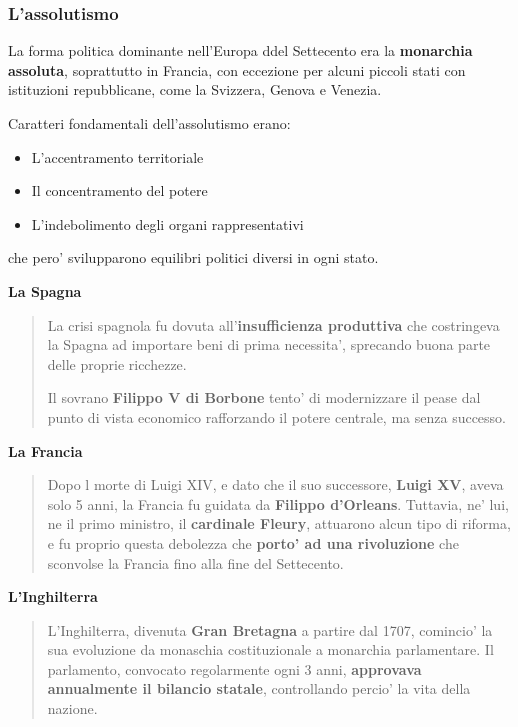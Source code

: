 \documentclass{article}
\begin{document}
{{    \subsubsection{L'assolutismo} %
    La forma politica dominante nell'Europa ddel Settecento era la \textbf{monarchia assoluta}, soprattutto in Francia, con eccezione per alcuni piccoli stati con istituzioni repubblicane, come la Svizzera, Genova e Venezia.

    Caratteri fondamentali dell'assolutismo erano:

    \begin{itemize}
      \item L'accentramento territoriale
      \item Il concentramento del potere
      \item L'indebolimento degli organi rappresentativi
    \end{itemize}

    che pero' svilupparono equilibri politici diversi in ogni stato.

    \textbf{La Spagna}
    \begin{quote}
      La crisi spagnola fu dovuta all'\textbf{insufficienza produttiva} che costringeva la Spagna ad importare beni di prima necessita', sprecando buona parte delle proprie ricchezze.

      Il sovrano \textbf{Filippo V di Borbone} tento' di modernizzare il pease dal punto di vista economico rafforzando il potere centrale, ma senza successo.
    \end{quote}

    \textbf{La Francia}
    \begin{quote}
      Dopo l morte di Luigi XIV, e dato che il suo successore, \textbf{Luigi XV}, aveva solo 5 anni, la Francia fu guidata da \textbf{Filippo d'Orleans}. Tuttavia, ne' lui, ne il primo ministro, il \textbf{cardinale Fleury}, attuarono alcun tipo di riforma, e fu proprio questa debolezza che \textbf{porto' ad una rivoluzione} che sconvolse la Francia fino alla fine del Settecento.
    \end{quote}

    \textbf{L'Inghilterra}
    \begin{quote}
      L'Inghilterra, divenuta \textbf{Gran Bretagna} a partire dal 1707, comincio' la sua evoluzione da monaschia costituzionale a monarchia parlamentare. Il parlamento, convocato regolarmente ogni 3 anni, \textbf{approvava annualmente il bilancio statale}, controllando percio' la vita della nazione.
    \end{quote}

}}
\end{document}
